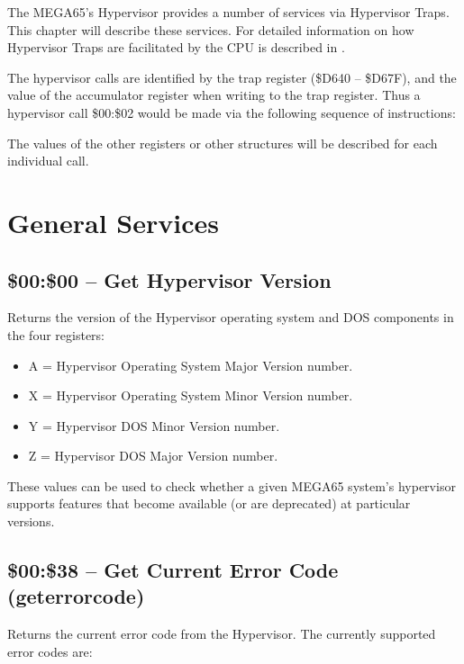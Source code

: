 The MEGA65's Hypervisor provides a number of services via Hypervisor Traps.
This chapter will describe these services.  For detailed information on how
Hypervisor Traps are facilitated by the CPU is described in .

The hypervisor calls are identified by the trap register (\$D640 -- \$D67F), and
the value of the accumulator register when writing to the trap register.  Thus
a hypervisor call \$00:\$02 would be made via the following sequence of instructions:


The values of the other registers or other structures will be described for
each individual call.

\section{General Services}

\subsection{\$00:\$00 -- Get Hypervisor Version}

Returns the version of the Hypervisor operating system and DOS components in the
four registers:

\begin{itemize}
  \item A = Hypervisor Operating System Major Version number. 
  \item X = Hypervisor Operating System Minor Version number. 
  \item Y = Hypervisor DOS Minor Version number. 
  \item Z = Hypervisor DOS Major Version number. 
\end{itemize}

These values can be used to check whether a given MEGA65 system's hypervisor
supports features that become available (or are deprecated) at particular versions.

\subsection{\$00:\$38 -- Get Current Error Code (geterrorcode)}

Returns the current error code from the Hypervisor.  The currently supported
error codes are:

